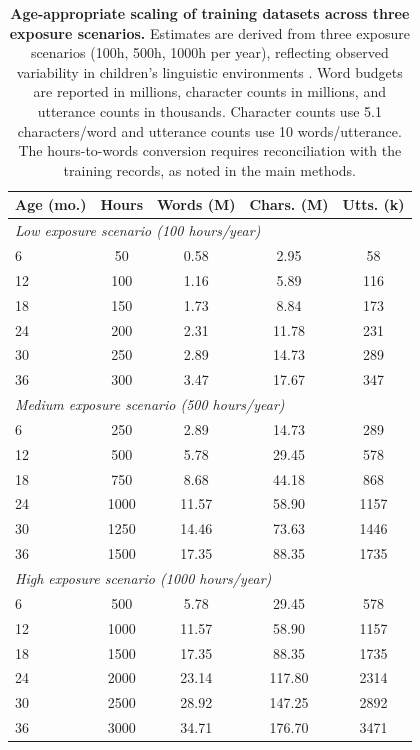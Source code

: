 \begin{table}[ht]
\centering
\small
\begin{tabular}{l c c c c}
\toprule
\textbf{Age (mo.)} & \textbf{Hours} & \textbf{Words (M)} & \textbf{Chars. (M)} & \textbf{Utts. (k)} \\

\midrule
\multicolumn{5}{l}{\textit{Low exposure scenario (100 hours/year)}} \\
\midrule
6   & 50   & 0.58  & 2.95  & 58   \\
12  & 100  & 1.16  & 5.89  & 116  \\
18  & 150  & 1.73  & 8.84  & 173  \\
24  & 200  & 2.31  & 11.78 & 231  \\
30  & 250  & 2.89  & 14.73 & 289  \\
36  & 300  & 3.47  & 17.67 & 347  \\
\midrule
\multicolumn{5}{l}{\textit{Medium exposure scenario (500 hours/year)}} \\
\midrule
6   & 250  & 2.89  & 14.73 & 289  \\
12  & 500  & 5.78  & 29.45 & 578  \\
18  & 750  & 8.68  & 44.18 & 868  \\
24  & 1000 & 11.57 & 58.90 & 1157 \\
30  & 1250 & 14.46 & 73.63 & 1446 \\
36  & 1500 & 17.35 & 88.35 & 1735 \\
\midrule
\multicolumn{5}{l}{\textit{High exposure scenario (1000 hours/year)}} \\
\midrule
6   & 500  & 5.78  & 29.45 & 578  \\
12  & 1000 & 11.57 & 58.90 & 1157 \\
18  & 1500 & 17.35 & 88.35 & 1735 \\
24  & 2000 & 23.14 & 117.80 & 2314 \\
30  & 2500 & 28.92 & 147.25 & 2892 \\
36  & 3000 & 34.71 & 176.70 & 3471 \\
\bottomrule
\end{tabular}
\caption{\textbf{Age-appropriate scaling of training datasets across three exposure scenarios.} Estimates are derived from three exposure scenarios (100h, 500h, 1000h per year), reflecting observed variability in children’s linguistic environments \citep{cristia2019child}. Word budgets are reported in millions, character counts in millions, and utterance counts in thousands. Character counts use 5.1 characters/word and utterance counts use 10 words/utterance. The hours-to-words conversion requires reconciliation with the training records, as noted in the main methods.}
\label{tab:train}
\end{table}


